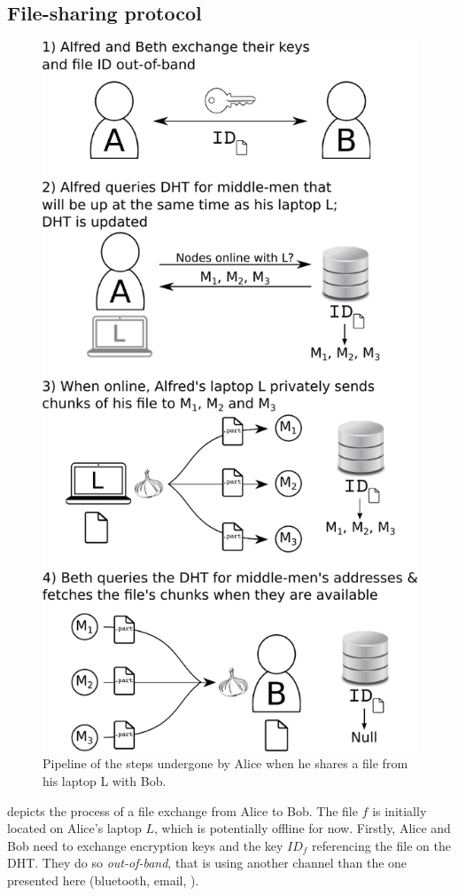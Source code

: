 \subsection{File-sharing protocol}%
\label{FileSharingProtocol}

\begin{figure}[t]
\centering
\includegraphics[width=0.8\columnwidth]{figures/schema.pdf}
\caption{\label{fig:pipeline}Pipeline of the steps undergone by Alice when he shares a file from his laptop L with Bob.}
\end{figure}

 depicts the process of a file exchange from Alice to Bob.
The file $f$ is initially located on Alice's laptop $L$, which is potentially offline for now.
Firstly, Alice and Bob need to exchange encryption keys and the key $ID_f$ 
referencing the file on the \ac{DHT}.
They do so \emph{out-of-band}, that is using another channel than the one 
presented here (\eg bluetooth, email, \etc).

